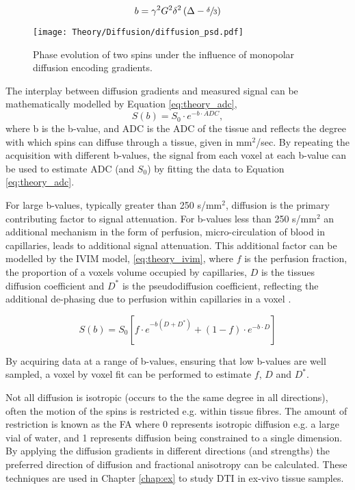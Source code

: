 \begin{equation}
	b=\gamma^2 G^2 \delta^2 \left( \Delta - \sfrac{\delta}{3}\right)
	\label{eq:theory_stejskal_tanner}
\end{equation}

\begin{figure}[H]
	\centering
	\texttt{[image: Theory/Diffusion/diffusion\_psd.pdf]}
	\caption{Phase evolution of two spins under the influence of monopolar diffusion encoding gradients.}
	\label{fig:theory_diffusion_psd}	
\end{figure}

The interplay between diffusion gradients and measured signal can be mathematically modelled by Equation \eqref{eq:theory_adc},
\begin{equation}
	S\left( b \right) = S_0 \cdot e^{-b \cdot ADC},
	\label{eq:theory_adc}
\end{equation}
where b is the b-value, and \acs{ADC} is the \acl{ADC} of the tissue and reflects the degree with which spins can diffuse through a tissue, given in mm$^2$/sec. By repeating the acquisition with different b-values, the signal from each voxel at each b-value can be used to estimate \ac{ADC} (and $S_0$) by fitting the data to Equation \eqref{eq:theory_adc}.

For large b-values, typically greater than 250 s/mm$^2$, diffusion is the primary contributing factor to signal attenuation. For b-values less than 250 s/mm$^2$ an additional mechanism in the form of perfusion, micro-circulation of blood in capillaries, leads to additional signal attenuation. This additional factor can be modelled by the \ac{IVIM} model, \eqref{eq:theory_ivim}, where $f$ is the perfusion fraction, the proportion of a voxels volume occupied by capillaries, $D$ is the tissues diffusion coefficient and $D^*$ is the pseudodiffusion coefficient, reflecting the additional de-phasing due to perfusion within capillaries in a voxel \cite{le_bihan_mr_1986,le_bihan_separation_1988}.

\begin{equation}
	S\left( b \right) = S_0 \left[ f \cdot e^{-b\left(D + D^*\right)} + \left( 1 - f\right) \cdot e^{-b \cdot D}\right]
	\label{eq:theory_ivim}
\end{equation}

By acquiring data at a range of b-values, ensuring that low b-values are well sampled, a voxel by voxel fit can be performed to estimate $f$, $D$ and $D^*$.

Not all diffusion is isotropic (occurs to the the same degree in all directions), often the motion of the spins is restricted e.g. within tissue fibres. The amount of restriction is known as the \ac{FA} where 0 represents isotropic diffusion e.g. a large vial of water, and 1 represents diffusion being constrained to a single dimension. By applying the diffusion gradients in different directions (and strengths) the preferred direction of diffusion and fractional anisotropy can be calculated. These techniques are used in Chapter \ref{chap:ex} to study \ac{DTI} in ex-vivo tissue samples.

